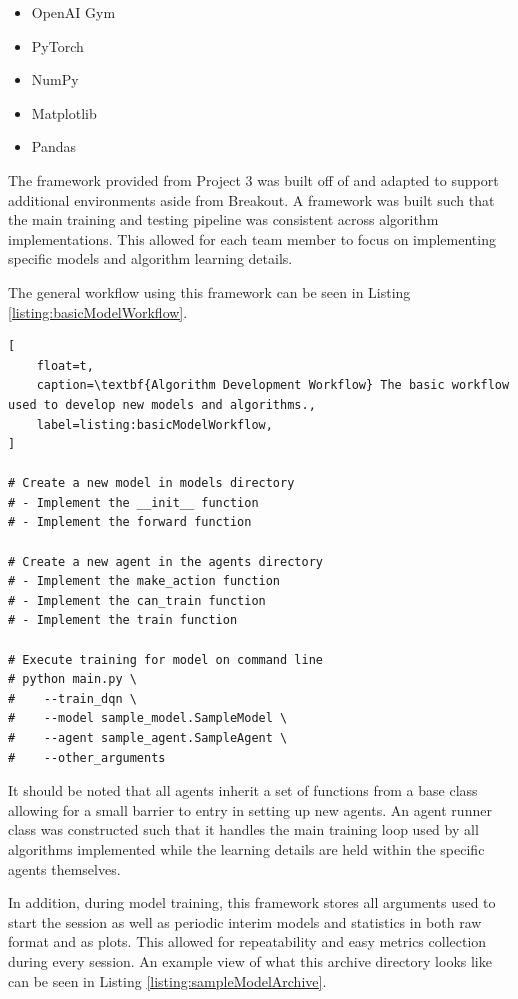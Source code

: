 \documentclass[conference]{IEEEtran}
\begin{document}
\begin{itemize}
    \item OpenAI Gym \cite{openaigym}
    \item PyTorch
    \item NumPy
    \item Matplotlib
    \item Pandas
\end{itemize}

The framework provided from Project 3 was built off of and adapted to support additional environments aside from Breakout.
A framework was built such that the main training and testing pipeline was consistent across algorithm implementations.
This allowed for each team member to focus on implementing specific models and algorithm learning details.

The general workflow using this framework can be seen in Listing \ref{listing:basicModelWorkflow}.

\begin{lstlisting}[
    float=t,
    caption=\textbf{Algorithm Development Workflow} The basic workflow used to develop new models and algorithms.,
    label=listing:basicModelWorkflow,
]

# Create a new model in models directory
# - Implement the __init__ function
# - Implement the forward function

# Create a new agent in the agents directory
# - Implement the make_action function
# - Implement the can_train function
# - Implement the train function

# Execute training for model on command line
# python main.py \
#    --train_dqn \
#    --model sample_model.SampleModel \
#    --agent sample_agent.SampleAgent \
#    --other_arguments

\end{lstlisting}

It should be noted that all agents inherit a set of functions from a base class allowing for a small barrier to entry in setting up new agents.
An agent runner class was constructed such that it handles the main training loop used by all algorithms implemented while the learning details are held within the specific agents themselves.

In addition, during model training, this framework stores all arguments used to start the session as well as periodic interim models and statistics in both raw format and as plots.
This allowed for repeatability and easy metrics collection during every session.
An example view of what this archive directory looks like can be seen in Listing \ref{listing:sampleModelArchive}.
\end{document}
